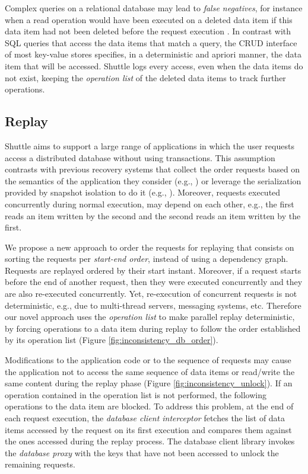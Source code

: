 Complex queries on a relational database may lead to \emph{false negatives}, for instance when a read operation would have been executed on a deleted data item if this data item had not been deleted before the request execution \cite{Xie2008}. In contrast with SQL queries that access the data items that match a query, the \ac{CRUD} interface of most key-value stores specifies, in a deterministic and apriori manner, the data item that will be accessed. Shuttle logs every access, even when the data items do not exist, keeping the \emph{operation list} of the deleted data items to track further operations.


\subsection{Replay}
\label{sec:recovery:replay}

Shuttle aims to support a large range of applications in which the user requests access a distributed database without using transactions. This assumption contrasts with previous recovery systems that collect the order requests based on the semantics of the application they consider (e.g., \cite{undoForOperators}) or leverage the serialization provided by snapshot isolation to do it (e.g., \cite{goel}). Moreover, requests executed concurrently during  normal execution, may  depend on each other, e.g., the first reads an item written by the second and the second reads an item written by the first.

We propose a new approach to order the requests for replaying that consists on sorting the requests per \emph{start-end order}, instead of using a dependency graph. Requests are replayed ordered by their start instant. Moreover, if a request starts before the end of another request, then they were executed concurrently and they are also re-executed concurrently. 
Yet, re-execution of concurrent requests is not deterministic, e.g., due to multi-thread servers, messaging systems, etc. Therefore our novel approach uses the \emph{operation list} to make parallel replay deterministic, by forcing operations to a data item during replay to follow the order established by its operation list (Figure \ref{fig:inconsistency_db_order}).

Modifications to the application code or to the sequence of requests may cause the application not to access the same sequence of data items or read/write the same content during the replay phase (Figure \ref{fig:inconsistency_unlock}). If an operation contained in the operation list is not performed, the following operations to the data item are blocked. To address this problem, at the end of each request execution, the \textit{database client interceptor} fetches the list of data items accessed by the request on its first execution and compares them against the ones accessed during the replay process. The database client library invokes the \emph{database proxy} with the keys that have not been accessed to unlock the remaining requests. 


